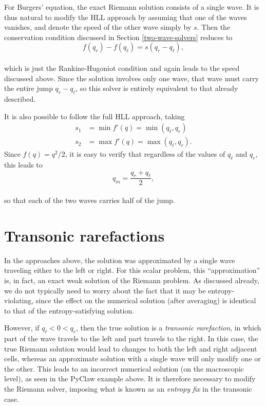 \documentclass{SIAMbook2016}
\begin{document}
For Burgers' equation, the exact Riemann solution consists of a single
wave. It is thus natural to modify the HLL approach by assuming that one
of the waves vanishes, and denote the speed of the other wave simply by
\(s\). Then the conservation condition discussed in
Section \ref{two-wave-solvers} reduces to\\
\[f(q_r) - f(q_\ell) = s (q_r - q_\ell),\]\\
which is just the Rankine-Hugoniot condition and again leads to the
speed discussed above. Since the solution involves only one wave, that
wave must carry the entire jump \(q_r - q_\ell\), so this solver is
entirely equivalent to that already described.

It is also possible to follow the full HLL approach, taking
\begin{align*}
s_1 & = \min f'(q) = \min(q_\ell, q_r) \\
s_2 & = \max f'(q) = \max(q_\ell, q_r).
\end{align*} Since \(f(q) = q^2/2\), it is easy to verify that
regardless of the values of \(q_\ell\) and \(q_r\), this leads to\\
\[q_m = \frac{q_r + q_\ell}{2},\]\\
so that each of the two waves carries half of the jump.

\hypertarget{transonic-rarefactions}{%
\section{Transonic rarefactions}\label{transonic-rarefactions}}

In the approaches above, the solution was approximated by a single wave
traveling either to the left or right. For this scalar problem, this
``approximation'' is, in fact, an exact weak solution of the Riemann
problem. As discussed already, we do not typically need to worry about
the fact that it may be entropy-violating, since the effect on the
numerical solution (after averaging) is identical to that of the
entropy-satisfying solution.

However, if \(q_\ell < 0 < q_r\), then the true solution is a
\emph{transonic rarefaction}, in which part of the wave travels to the
left and part travels to the right. In this case, the true Riemann
solution would lead to changes to both the left and right adjacent
cells, whereas an approximate solution with a single wave will only
modify one or the other. This leads to an incorrect numerical solution
(on the macroscopic level), as seen in the PyClaw example above. It is
therefore necessary to modify the Riemann solver, imposing what is known
as an \emph{entropy fix} in the transonic case.
\end{document}
